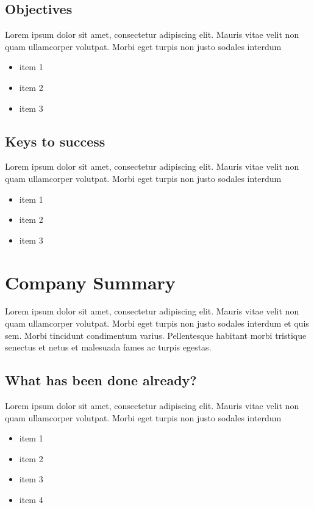 \documentclass[11pt]{article}
\begin{document}
\subsection{Objectives}
Lorem ipsum dolor sit amet, consectetur adipiscing elit. Mauris vitae velit 
non quam ullamcorper volutpat. Morbi eget turpis non justo sodales interdum
\newline
\begin{itemize}
\item item 1
\item item 2
\item item 3
\end{itemize}

\subsection{Keys to success}
Lorem ipsum dolor sit amet, consectetur adipiscing elit. Mauris vitae velit 
non quam ullamcorper volutpat. Morbi eget turpis non justo sodales interdum
\newline
\begin{itemize}
\item item 1
\item item 2
\item item 3
\end{itemize}

\section{Company Summary}
Lorem ipsum dolor sit amet, consectetur adipiscing elit. Mauris vitae velit 
non quam ullamcorper volutpat. Morbi eget turpis non justo sodales interdum 
et quis sem. Morbi tincidunt condimentum varius. Pellentesque habitant morbi 
tristique senectus et netus et malesuada fames ac turpis egestas.\newline

\subsection{What has been done already?}
Lorem ipsum dolor sit amet, consectetur adipiscing elit. Mauris vitae velit 
non quam ullamcorper volutpat. Morbi eget turpis non justo sodales interdum
\newline
\begin{itemize}
\item item 1
\item item 2
\item item 3
\item item 4
\end{itemize}
\end{document}
